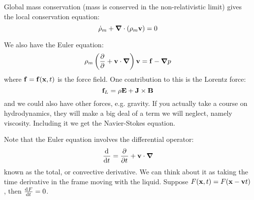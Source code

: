 Global mass conservation (mass is conserved in the non-relativistic limit) gives the local conservation equation:
\begin{equation}
    \dot{\rho}_m + \nabla \cdot (\rho_m\v{v}) = 0
\end{equation}

We also have the Euler equation:
\begin{equation}
    \rho_m\left(\dpd{}{} + \v{v} \cdot \nabla\right)\v{v} = \v{f} - \nabla p
\end{equation}
where $\mathbf{f} = \mathbf{f}(\mathbf{x}, t)$ is the force field. One contribution to this is the Lorentz force:
\begin{equation}
    \mathbf{f}_L = \rho \mathbf{E} + \mathbf{J} \times \mathbf{B}
\end{equation}
and we could also have other forces, e.g. gravity. If you actually take a course on hydrodynamics, they will make a big deal of a term we will neglect, namely viscosity. Including it we get the Navier-Stokes equation.

Note that the Euler equation involves the differential operator:
\begin{equation}
    \dod{}{t} = \dpd{}{t} + \v{v} \cdot \nabla
\end{equation}
known as the total, or convective derivative. We can think about it as taking the time derivative in the frame moving with the liquid. Suppose $F(\mathbf{x}, t) = F(\mathbf{x} - \mathbf{v}t)$, then $\od{F}{t} = 0$.

